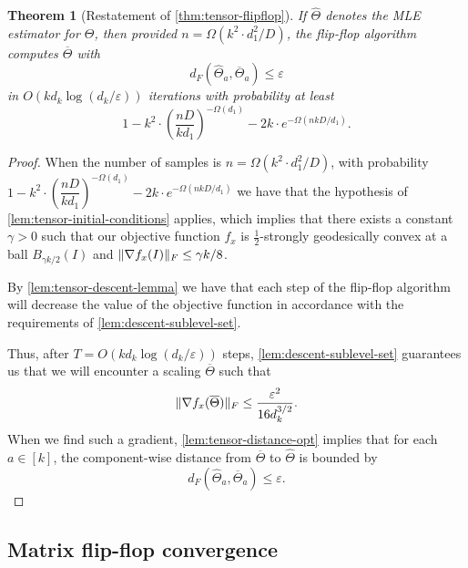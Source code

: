 \documentclass{article}
\newtheorem{theorem}{Theorem}
\DeclarePairedDelimiter{\norm}{\lVert}{\rVert}
\newcommand{\otheta}{\overline{\Theta}}
\newcommand{\htheta}{\hat{\Theta}}
\newcommand\eps{\varepsilon}
\begin{document}
\begin{theorem}[Restatement of \cref{thm:tensor-flipflop}]
	If $\htheta$ denotes the MLE estimator for $\Theta$, then provided $n = \Omega(k^2 \cdot d_1^2/D)$, the flip-flop algorithm computes $\otheta$ with 
	$$ d_F(\htheta_a, \otheta_a) \leq \eps $$
	in $O(k d_k \log(d_k/\eps))$ iterations with probability at least 
	$$ 1 - k^2 \cdot \left( \dfrac{nD}{k d_1} \right)^{-\Omega(d_1)} - 2k \cdot e^{- \Omega(nkD/d_1)}.$$
\end{theorem}

\begin{proof}
	When the number of samples is $n = \Omega(k^2 \cdot d_1^2/D)$, with probability \\
	$ 1 - k^2 \cdot \left( \dfrac{nD}{k d_1} \right)^{-\Omega(d_1)} - 2k \cdot e^{- \Omega(nkD/d_1)}$ we have that the hypothesis of \cref{lem:tensor-initial-conditions} applies, which implies that there exists a constant $\gamma > 0$ such that our objective function $f_x$ is $\frac{1}{2}$-strongly geodesically convex at a ball $B_{\gamma k/2}(I)$ and $\norm{\nabla f_x(I)}_F \leq \gamma k /8$.
	
	By \cref{lem:tensor-descent-lemma} we have that each step of the flip-flop algorithm will decrease the value of the objective function in accordance with the requirements of \cref{lem:descent-sublevel-set}. 
	
	Thus, after $T = O( k d_k \log(d_k/\eps) )$ steps, \cref{lem:descent-sublevel-set} guarantees us that we will encounter a scaling $\otheta$ such that
	$$ \norm{\nabla f_x(\otheta)}_F \leq \dfrac{\eps^2}{16 d_k^{3/2}}.$$
	When we find such a gradient, \cref{lem:tensor-distance-opt} implies that for each $a \in [k]$, the component-wise distance from $\otheta$ to $\htheta$ is bounded by
	$$ d_F(\htheta_a, \otheta_a) \leq \eps. $$
\end{proof}

\subsection{Matrix flip-flop convergence}
\end{document}
